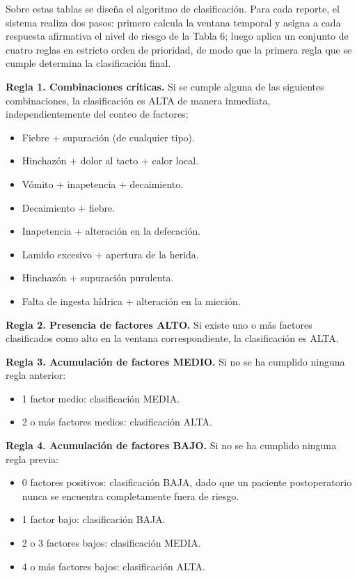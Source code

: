 \documentclass[stu, spanish]{apa7}
\begin{document}
Sobre estas tablas se dise\~{n}a el algoritmo de clasificaci\'{o}n. Para cada reporte, el sistema realiza dos pasos: primero calcula la ventana temporal y asigna a cada respuesta afirmativa el nivel de riesgo de la Tabla 6; luego aplica un conjunto de cuatro reglas en estricto orden de prioridad, de modo que la primera regla que se cumple determina la clasificaci\'{o}n final.

\textbf{Regla 1. Combinaciones cr\'{i}ticas.} Si se cumple alguna de las siguientes combinaciones, la clasificaci\'{o}n es ALTA de manera inmediata, independientemente del conteo de factores:

\begin{itemize}
    \item Fiebre + supuraci\'{o}n (de cualquier tipo).
    \item Hinchaz\'{o}n + dolor al tacto + calor local.
    \item V\'{o}mito + inapetencia + decaimiento.
    \item Decaimiento + fiebre.
    \item Inapetencia + alteraci\'{o}n en la defecaci\'{o}n.
    \item Lamido excesivo + apertura de la herida.
    \item Hinchaz\'{o}n + supuraci\'{o}n purulenta.
    \item Falta de ingesta h\'{i}drica + alteraci\'{o}n en la micci\'{o}n.
\end{itemize}

\textbf{Regla 2. Presencia de factores ALTO.} Si existe uno o m\'{a}s factores clasificados como alto en la ventana correspondiente, la clasificaci\'{o}n es ALTA.

\textbf{Regla 3. Acumulaci\'{o}n de factores MEDIO.} Si no se ha cumplido ninguna regla anterior:

\begin{itemize}
    \item 1 factor medio: clasificaci\'{o}n MEDIA.
    \item 2 o m\'{a}s factores medios: clasificaci\'{o}n ALTA.
\end{itemize}

\textbf{Regla 4. Acumulaci\'{o}n de factores BAJO.} Si no se ha cumplido ninguna regla previa:

\begin{itemize}
    \item 0 factores positivos: clasificaci\'{o}n BAJA, dado que un paciente postoperatorio nunca se encuentra completamente fuera de riesgo.
    \item 1 factor bajo: clasificaci\'{o}n BAJA.
    \item 2 o 3 factores bajos: clasificaci\'{o}n MEDIA.
    \item 4 o m\'{a}s factores bajos: clasificaci\'{o}n ALTA.
\end{itemize}
\end{document}

